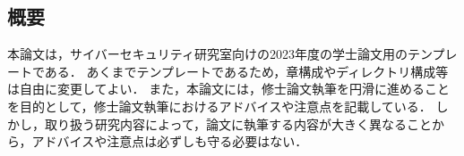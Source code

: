 \begin{center}
\subsection*{概要}
\end{center}

本論文は，サイバーセキュリティ研究室向けの2023年度の学士論文用のテンプレートである．
あくまでテンプレートであるため，章構成やディレクトリ構成等は自由に変更してよい．
また，本論文には，修士論文執筆を円滑に進めることを目的として，修士論文執筆におけるアドバイスや注意点を記載している．
しかし，取り扱う研究内容によって，論文に執筆する内容が大きく異なることから，アドバイスや注意点は必ずしも守る必要はない．

